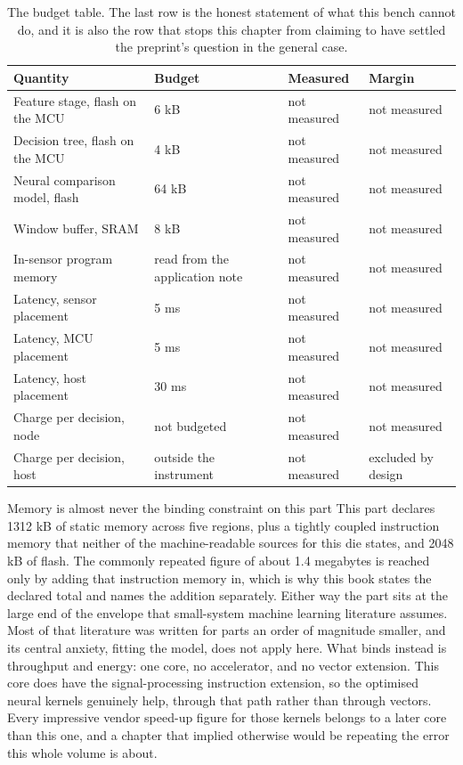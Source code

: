 \begin{table}[H]\centering\small
\begin{tabular}{p{44mm}p{28mm}p{28mm}p{30mm}}
\toprule
Quantity & Budget & Measured & Margin \\
\midrule
Feature stage, flash on the MCU & 6 kB & not measured & not measured \\
Decision tree, flash on the MCU & 4 kB & not measured & not measured \\
Neural comparison model, flash & 64 kB & not measured & not measured \\
Window buffer, SRAM & 8 kB & not measured & not measured \\
In-sensor program memory & read from the application note & not measured & not measured \\
Latency, sensor placement & 5 ms & not measured & not measured \\
Latency, MCU placement & 5 ms & not measured & not measured \\
Latency, host placement & 30 ms & not measured & not measured \\
Charge per decision, node & not budgeted & not measured & not measured \\
Charge per decision, host & outside the instrument & not measured & excluded by design \\
\bottomrule
\end{tabular}
\caption{The budget table. The last row is the honest statement of what this bench cannot do, and it is also the row that stops this chapter from claiming to have settled the preprint's question in the general case.}
\end{table}

\begin{note}{Memory is almost never the binding constraint on this part}
This part declares 1312 kB of static memory across five regions, plus a tightly
coupled instruction memory that neither of the machine-readable sources for this
die states, and 2048 kB of flash. The commonly repeated figure of about 1.4
megabytes is reached only by adding that instruction memory in, which is why
this book states the declared total and names the addition separately. Either
way the part sits at the large end of the envelope that small-system machine
learning literature assumes. Most of that literature was written for parts an order of
magnitude smaller, and its central anxiety, fitting the model, does not apply
here. What binds instead is throughput and energy: one core, no accelerator, and
no vector extension. This core does have the signal-processing instruction
extension, so the optimised neural kernels genuinely help, through that path
rather than through vectors. Every impressive vendor speed-up figure for those
kernels belongs to a later core than this one, and a chapter that implied
otherwise would be repeating the error this whole volume is about.
\end{note}

